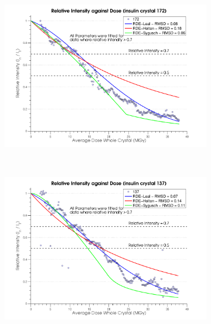 \begin{figure}[H]
    \ContinuedFloat
    \centering
    \begin{subfigure}[b]{1\textwidth}
        \centering
        \includegraphics[width=\textwidth]{figures/dwd/relintplot172.pdf}
        \caption{}
        \label{Relative Intensity Plots - 172}
    \end{subfigure}
			\\
    \begin{subfigure}[b]{1\textwidth}
        \centering
        \includegraphics[width=\textwidth]{figures/dwd/relintplot137.pdf}
        \caption{}
        \label{Relative Intensity Plots - 137}
    \end{subfigure}
\end{figure}
